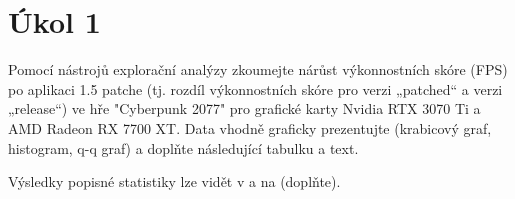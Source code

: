 \section*{Úkol 1}
\label{sec:task-1}

Pomocí nástrojů explorační analýzy zkoumejte nárůst výkonnostních skóre (FPS) po aplikaci 1.5 patche 
(tj. rozdíl výkonnostních skóre pro verzi „patched“ a verzi „release“) ve hře "Cyberpunk 2077" pro grafické karty 
Nvidia RTX 3070 Ti a AMD Radeon RX 7700 XT. Data vhodně graficky prezentujte (krabicový graf, histogram, q-q graf) 
a doplňte následující tabulku a text.

\vspace{2em}
\noindent
Výsledky popisné statistiky lze vidět v  a na \TODO (doplňte).

\newcommand{\rangeValues}       {0, 0, 0, 0}
\newcommand{\minValues}         {0, 0, 0, 0}
\newcommand{\QfValues}          {0, 0, 0, 0}
\newcommand{\medianValues}      {0, 0, 0, 0}
\newcommand{\meanValues}        {0, 0, 0, 0}
\newcommand{\QtValues}          {0, 0, 0, 0}
\newcommand{\maxValues}         {0, 0, 0, 0}
\newcommand{\sdValues}          {0, 0, 0, 0}
\newcommand{\cvValues}          {0, 0, 0, 0}
\newcommand{\skewnessValues}    {0, 0, 0, 0}
\newcommand{\kurtosisValues}    {0, 0, 0, 0}
\newcommand{\lowerBoundValues}  {0, 0, 0, 0}
\newcommand{\upperBoundValues}  {0, 0, 0, 0}

\newcommand{\sigmaValues}       {0, 0, 0, 0}

\newcommand{\tableValue}[2]{%
    \pgfmathparse{{#1}[#2]}%
    \mbox{\pgfmathresult}%
}

